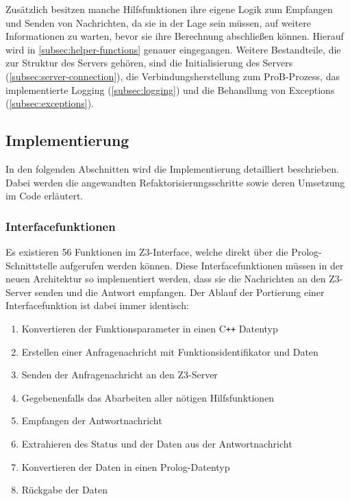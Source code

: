 Zusätzlich besitzen manche Hilfsfunktionen ihre eigene Logik zum Empfangen und Senden von Nachrichten,
da sie in der Lage sein müssen, auf weitere Informationen zu warten, bevor sie ihre Berechnung abschließen können.
Hierauf wird in \cref{subsec:helper-functions} genauer eingegangen.
Weitere Bestandteile, die zur Struktur des Servers gehören, sind die Initialisierung des Servers (\cref{subsec:server-connection}), die Verbindungsherstellung zum ProB-Prozess,
das implementierte Logging (\cref{subsec:logging}) und die Behandlung von Exceptions (\cref{subsec:exceptions}).
\vspace{3em}
\subsection{Implementierung}

In den folgenden Abschnitten wird die Implementierung detailliert beschrieben.
Dabei werden die angewandten Refaktorisierungsschritte sowie deren Umsetzung im Code erläutert.
\clearpage
\subsubsection{Interfacefunktionen}

Es existieren 56 Funktionen im Z3-Interface, welche direkt über die Prolog-Schnittstelle aufgerufen werden können.
Diese Interfacefunktionen müssen in der neuen Architektur so implementiert werden, dass sie die Nachrichten an den Z3-Server senden und die Antwort empfangen.
Der Ablauf der Portierung einer Interfacefunktion ist dabei immer identisch:

\begin{enumerate}
  \item Konvertieren der Funktionsparameter in einen C\texttt{++} Datentyp
  \item Erstellen einer Anfragenachricht mit Funktionsidentifikator und Daten
  \item Senden der Anfragenachricht an den Z3-Server
  \item Gegebenenfalls das Abarbeiten aller nötigen Hilfsfunktionen
  \item Empfangen der Antwortnachricht
  \item Extrahieren des Status und der Daten aus der Antwortnachricht
  \item Konvertieren der Daten in einen Prolog-Datentyp
  \item Rückgabe der Daten
\end{enumerate}

